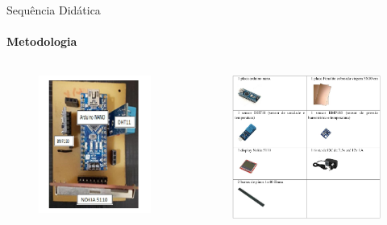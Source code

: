 \documentclass[aspectratio=169]{beamer}
\begin{document}
\begin{frame}{Sequência Didática}
	\framesubtitle{Metodologia}
	\begin{columns}
		\begin{figure}[htb!]
			\centering
			\includegraphics[width=.5\linewidth]{img/placa_arduino.png}
			\caption{\cite{MARIO:2017}}
		\end{figure}

		\begin{figure}[htb!]
			\centering
			\includegraphics[width=.7\textwidth]{img/placa_arduino_cmpnts.png}
		\end{figure}
	\end{columns}
\end{frame}
\end{document}

